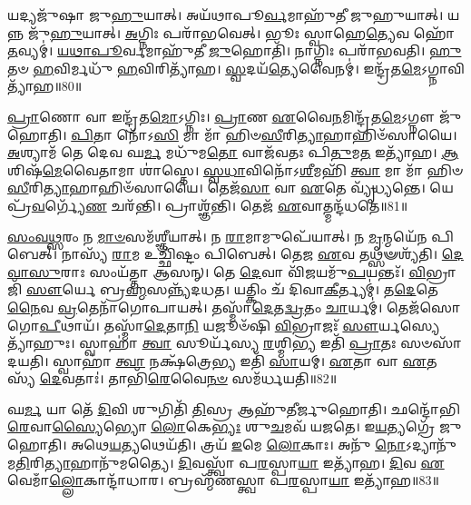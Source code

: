 𑌯𑌦𑍍𑌯𑌜𑍁᳴𑌷𑌾 𑌜𑍁\-\ul{𑌹𑍁}\-𑌯𑌾𑌤𑍍। 
𑌅𑌯᳴𑌥𑌾𑌪𑍂\-\ul{𑌰𑍍𑌵}\-𑌮𑌾𑌹𑍁᳴𑌤𑍀 𑌜𑍁𑌹𑍁𑌯𑌾𑌤𑍍। 
𑌯𑌨𑍍𑌨 𑌜𑍁᳴\-\ul{𑌹𑍁}\-𑌯𑌾𑌤𑍍। 
\-\ul{𑌅}\-𑌗𑍍𑌨𑌿𑌃 𑌪𑌰𑌾᳴𑌭𑌵𑍇𑌤𑍍। 
𑌭𑍂𑌃 𑌸𑍍𑌵𑌾𑌹𑍇\-\ul{𑌤𑍍𑌯𑍇}\-𑌵 𑌹𑍋᳴\-\ul{𑌤}\-𑌵𑍍𑌯𑌮𑍍॑। 
\-\ul{𑌯}\-\-\ul{𑌥𑌾}\-\-\ul{𑌪𑍂}\-𑌰𑍍𑌵𑌮𑌾𑌹𑍁᳴𑌤𑍀 \ul{𑌜𑍁}\-𑌹𑍋𑌤𑌿᳴। 
𑌨𑌾𑌗𑍍𑌨𑌿𑌃 𑌪𑌰𑌾᳴𑌭𑌵𑌤𑌿। 
\-\ul{𑌹𑍁}\-𑌤𑍞 \ul{𑌹}\-𑌵𑌿𑌰𑍍𑌮𑌧𑍁᳴ \ul{𑌹}\-𑌵𑌿𑌰𑌿𑌤𑍍𑌯𑌾᳴𑌹। 
\-\ul{𑌸𑍍𑌵}\-𑌦𑌯᳴\-\ul{𑌤𑍍𑌯𑍇}\-𑌵𑍈𑌨𑌮𑍍॑। 
𑌇𑌨𑍍𑌦𑍍𑌰᳴𑌤\-\ul{𑌮𑍇}\-𑌽𑌗𑍍𑌨𑌾𑌵𑌿𑌤𑍍𑌯𑌾᳴𑌹॥80॥

\-\ul{𑌪𑍍𑌰𑌾}\-𑌣𑍋 𑌵𑌾 𑌇𑌨𑍍𑌦𑍍𑌰᳴𑌤\-\ul{𑌮𑍋}\-𑌽𑌗𑍍𑌨𑌿𑌃। 
\-\ul{𑌪𑍍𑌰𑌾}\-𑌣 \ul{𑌏}\-𑌵𑍈\-\ul{𑌨}\-𑌮𑌿𑌨𑍍𑌦𑍍𑌰᳴𑌤\-\ul{𑌮𑍇}\-𑌽𑌗𑍍𑌨𑍗 𑌜𑍁᳴𑌹𑍋𑌤𑌿। 
\-\ul{𑌪𑌿}\-𑌤𑌾 𑌨𑍋᳴𑌽\-\ul{𑌸𑌿} 𑌮𑌾 𑌮𑌾᳴ 𑌹𑌿𑍞\-\ul{𑌸𑍀}\-𑌰𑌿\-\ul{𑌤𑍍𑌯𑌾}\-𑌹𑌾𑌹𑌿𑍞᳴𑌸𑌾𑌯𑍈। 
\-\ul{𑌅}\-𑌶𑍍𑌯𑌾𑌮᳴ 𑌤𑍇 𑌦𑍇𑌵 𑌘\-\ul{𑌰𑍍𑌮} 𑌮𑌧𑍁᳴𑌮\-\ul{𑌤𑍋} 𑌵𑌾𑌜᳴𑌵𑌤𑌃 𑌪𑌿\-\ul{𑌤𑍁}\-𑌮\-\ul{𑌤} 𑌇𑌤𑍍𑌯𑌾᳴𑌹। 
\-\ul{𑌆}\-𑌶𑌿𑌷᳴\-\ul{𑌮𑍇}\-𑌵𑍈𑌤𑌾𑌮𑌾 𑌶𑌾॑𑌸𑍍𑌤𑍇। 
\-\ul{𑌸𑍍𑌵}\-\-\ul{𑌧𑌾}\-𑌵𑌿𑌨𑍋᳴𑌽\-\ul{𑌶𑍀}\-𑌮𑌹𑌿᳴ \ul{𑌤𑍍𑌵𑌾} 𑌮𑌾 𑌮𑌾᳴ 𑌹𑌿𑍞\-\ul{𑌸𑍀}\-𑌰𑌿\-\ul{𑌤𑍍𑌯𑌾}\-𑌹𑌾𑌹𑌿𑍞᳴𑌸𑌾𑌯𑍈। 
𑌤𑍇𑌜᳴\-\ul{𑌸𑌾} 𑌵𑌾 \ul{𑌏}\-𑌤𑍇 𑌵𑍍𑌯𑍃᳴𑌧𑍍𑌯𑌨𑍍𑌤𑍇। 
𑌯𑍇 𑌪𑍍𑌰᳴\-\ul{𑌵}\-𑌰𑍍𑌗𑍍𑌯𑍇᳴\-\ul{𑌣} 𑌚𑌰᳴𑌨𑍍𑌤𑌿। 
𑌪𑍍𑌰𑌾𑌶𑍍𑌞᳴𑌨𑍍𑌤𑌿। 
𑌤𑍇𑌜᳴ \ul{𑌏}\-𑌵𑌾𑌤𑍍𑌮𑌨𑍍𑌦᳴𑌧𑌤𑍇॥81॥

\-\ul{𑌸𑌂}\-\-\ul{𑌵}\-\-\ul{𑌥𑍍𑌸}\-𑌰𑌂 𑌨 \ul{𑌮𑌾}\-\-\ul{𑍞}\-𑌸𑌮᳴𑌶𑍍𑌞𑍀𑌯𑌾𑌤𑍍। 
𑌨 \ul{𑌰𑌾}\-𑌮𑌾𑌮𑍁𑌪𑍇᳴𑌯𑌾𑌤𑍍। 
𑌨 \ul{𑌮𑍃}\-𑌨𑍍𑌮𑌯𑍇᳴𑌨 𑌪𑌿𑌬𑍇𑌤𑍍। 
𑌨𑌾𑌸𑍍𑌯᳴ \ul{𑌰𑌾}\-𑌮 𑌉𑌚𑍍𑌛𑌿᳴𑌷𑍍𑌟𑌂 𑌪𑌿𑌬𑍇𑌤𑍍। 
𑌤𑍇𑌜 \ul{𑌏}\-𑌵 𑌤𑌥𑍍𑌸𑍟𑌶𑍍𑌯᳴𑌤𑌿। 
\-\ul{𑌦𑍇}\-\-\ul{𑌵𑌾}\-\-\ul{𑌸𑍁}\-𑌰𑌾𑌃 𑌸𑌂𑌯᳴𑌤𑍍𑌤𑌾 𑌆𑌸𑌨𑍍। 
𑌤𑍇 \ul{𑌦𑍇}\-𑌵𑌾 𑌵𑌿᳴\-\ul{𑌜}\-𑌯𑌮𑍁᳴\-\ul{𑌪}\-𑌯𑌨𑍍𑌤𑌃᳴। 
\-\ul{𑌵𑌿}\-𑌭𑍍𑌰𑌾𑌜𑌿᳴ \ul{𑌸𑍗}\-𑌰𑍍𑌯𑍇 𑌬𑍍𑌰\-\ul{𑌹𑍍𑌮}\-𑌸𑌨𑍍𑌨𑍍𑌯᳴𑌦𑌧𑌤। 
𑌯𑌤𑍍𑌕𑌿𑌂 𑌚᳴ 𑌦𑌿𑌵𑌾\-\ul{𑌕𑍀}\-𑌰𑍍𑌤𑍍𑌯𑌮𑍍॑। 
𑌤\-\ul{𑌦𑍇}\-𑌤𑍇\-\ul{𑌨𑍈}\-𑌵 \ul{𑌵𑍍𑌰}\-𑌤𑍇𑌨𑌾᳴𑌗𑍋𑌪𑌾𑌯𑌤𑍍। 
𑌤𑌸𑍍𑌮𑌾᳴\-\ul{𑌦𑍇}\-𑌤\-\ul{𑌦𑍍𑌵𑍍𑌰}\-𑌤𑌂 \ul{𑌚𑌾}\-𑌰𑍍𑌯𑌮𑍍॑। 
𑌤𑍇𑌜᳴𑌸𑍋 𑌗𑍋\-\ul{𑌪𑍀}\-𑌥𑌾𑌯᳴। 
𑌤𑌸𑍍𑌮𑌾᳴\-\ul{𑌦𑍇}\-𑌤𑌾\-\ul{𑌨𑌿} 𑌯𑌜𑍂𑍞᳴𑌷𑌿 \ul{𑌵𑌿}\-𑌭𑍍𑌰𑌾𑌜𑌃᳴ \ul{𑌸𑍗}\-𑌰𑍍𑌯𑌸𑍍𑌯𑍇𑌤𑍍𑌯𑌾᳴𑌹𑍁𑌃। 
𑌸𑍍𑌵𑌾𑌹𑌾॑ \ul{𑌤𑍍𑌵𑌾} 𑌸𑍂𑌰𑍍𑌯᳴𑌸𑍍𑌯 \ul{𑌰}\-𑌶𑍍𑌮𑌿\-\ul{𑌭𑍍𑌯} 𑌇𑌤𑌿᳴ \ul{𑌪𑍍𑌰𑌾}\-𑌤𑌃 𑌸𑍞𑌸𑌾᳴𑌦𑌯𑌤𑌿। 
𑌸𑍍𑌵𑌾𑌹𑌾॑ \ul{𑌤𑍍𑌵𑌾} 𑌨𑌕𑍍𑌷᳴𑌤𑍍𑌰𑍇\-\ul{𑌭𑍍𑌯} 𑌇𑌤𑌿᳴ \ul{𑌸𑌾}\-𑌯𑌮𑍍। 
\-\ul{𑌏}\-𑌤𑌾 𑌵𑌾 \ul{𑌏}\-𑌤𑌸𑍍𑌯᳴ \ul{𑌦𑍇}\-𑌵𑌤𑌾𑌃॑। 
𑌤𑌾𑌭𑌿᳴\-\ul{𑌰𑍇}\-𑌵𑍈\-\ul{𑌨}\-\-\ul{𑍞} 𑌸𑌮᳴𑌰𑍍𑌧𑌯𑌤𑌿॥82॥

𑌘\-\ul{𑌰𑍍𑌮} 𑌯𑌾 𑌤𑍇᳴ \ul{𑌦𑌿}\-𑌵𑌿 𑌶𑍁𑌗𑌿𑌤𑌿᳴ \ul{𑌤𑌿}\-𑌸𑍍𑌰 𑌆𑌹𑍁᳴𑌤𑍀𑌰𑍍𑌜𑍁𑌹𑍋𑌤𑌿। 
𑌛𑌨𑍍𑌦𑍋᳴𑌭𑌿\-\ul{𑌰𑍇}\-𑌵𑌾\-\ul{𑌸𑍍𑌯𑍈}\-𑌭𑍍𑌯𑍋 \ul{𑌲𑍋}\-𑌕𑍇\-\ul{𑌭𑍍𑌯𑌃} 𑌶𑍁\-\ul{𑌚}\-𑌮𑌵᳴ 𑌯𑌜𑌤𑍇। 
𑌇\-\ul{𑌯}\-𑌤𑍍𑌯𑌗𑍍𑌰𑍇᳴ 𑌜𑍁𑌹𑍋𑌤𑌿। 
𑌅𑌥𑍇\-\ul{𑌯}\-𑌤𑍍𑌯𑌥𑍇𑌯᳴𑌤𑌿। 
𑌤𑍍𑌰𑌯᳴ \ul{𑌇}\-𑌮𑍇 \ul{𑌲𑍋}\-𑌕𑌾𑌃। 
𑌅𑌨𑍁᳴ \ul{𑌨𑍋}\-𑌽𑌦𑍍𑌯𑌾𑌨𑍁᳴\-𑌮\-\ul{𑌤𑌿}\-𑌰𑌿\-\ul{𑌤𑍍𑌯𑌾}\-𑌹𑌾𑌨𑍁᳴𑌮𑌤𑍍𑌯𑍈। 
\-\ul{𑌦𑌿}\-𑌵𑌸𑍍𑌤𑍍𑌵𑌾᳴ 𑌪\-\ul{𑌰}\-𑌸𑍍𑌪𑌾\-\ul{𑌯𑌾} 𑌇𑌤𑍍𑌯𑌾᳴𑌹। 
\-\ul{𑌦𑌿}\-𑌵 \ul{𑌏}\-𑌵𑍇𑌮𑌾𑌁\-\ul{𑌲𑍍𑌲𑍋}\-𑌕𑌾𑌨𑍍𑌦𑌾᳴𑌧𑌾𑌰। 
𑌬𑍍𑌰𑌹𑍍𑌮᳴𑌣𑌸𑍍𑌤𑍍𑌵𑌾 𑌪\-\ul{𑌰}\-𑌸𑍍𑌪𑌾\-\ul{𑌯𑌾} 𑌇𑌤𑍍𑌯𑌾᳴𑌹॥83॥

